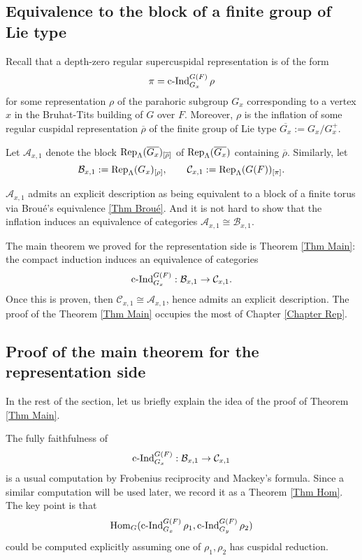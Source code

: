 \subsection{Equivalence to the block of a finite group of Lie type}

Recall that a depth-zero regular supercuspidal representation is of the form
$$\pi=\operatorname{\operatorname{c-Ind}}_{G_x}^{G(F)}\rho$$
for some representation $\rho$ of the parahoric subgroup $G_x$ corresponding to a vertex $x$ in the Bruhat-Tits building of $G$ over $F$. Moreover, $\rho$ is the inflation of some regular cuspidal representation $\overline{\rho}$ of the finite group of Lie type $\overline{G_x}:=G_x/G_x^+$.

Let $\mathcal{A}_{x,1}$ denote the block $\operatorname{\operatorname{Rep}}_{\Lambda}(\overline{G_x})_{[\overline{\rho}]}$ of $\operatorname{\operatorname{Rep}}_{\Lambda}(\overline{G_x})$ containing $\overline{\rho}$. Similarly, let 
$$\mathcal{B}_{x,1}:=\operatorname{\operatorname{Rep}}_{\Lambda}(G_x)_{[\rho]},\qquad \mathcal{C}_{x,1}:=\operatorname{\operatorname{Rep}}_{\Lambda}(G(F))_{[\pi]}.$$

$\mathcal{A}_{x,1}$ admits an explicit description as being equivalent to a block of a finite torus via Broué's equivalence \ref{Thm Broué}. And it is not hard to show that the inflation induces an equivalence of categories $\mathcal{A}_{x,1} \cong \mathcal{B}_{x,1}$.

The main theorem we proved for the representation side is Theorem \ref{Thm Main}: the compact induction induces an equivalence of categories
$$\operatorname{\operatorname{c-Ind}}_{G_x}^{G(F)}: \mathcal{B}_{x,1} \to \mathcal{C}_{x,1}.$$
Once this is proven, then $\mathcal{C}_{x,1} \cong \mathcal{A}_{x,1}$, hence admits an explicit description. The proof of the Theorem \ref{Thm Main} occupies the most of Chapter \ref{Chapter Rep}. 

\subsection{Proof of the main theorem for the representation side}

In the rest of the section, let us briefly explain the idea of the proof of Theorem \ref{Thm Main}.

The fully faithfulness of 
$$\operatorname{\operatorname{c-Ind}}_{G_x}^{G(F)}: \mathcal{B}_{x,1} \to \mathcal{C}_{x,1}$$
is a usual computation by Frobenius reciprocity and Mackey's formula. Since a similar computation will be used later, we record it as a Theorem \ref{Thm Hom}. The key point is that 
$$\operatorname{\operatorname{Hom}}_G(\operatorname{\operatorname{c-Ind}}_{G_x}^{G(F)}\rho_1, \operatorname{\operatorname{c-Ind}}_{G_y}^{G(F)}\rho_2)$$
could be computed explicitly assuming one of $\rho_1, \rho_2$ has cuspidal reduction. 

